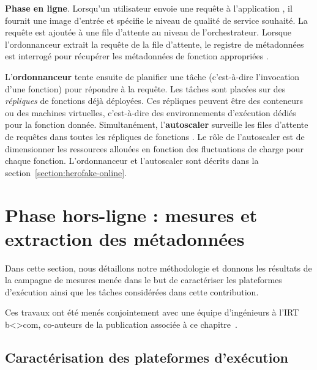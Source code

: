 \textbf{Phase en ligne}. Lorsqu'un utilisateur envoie une requête à l'application , il fournit une image d'entrée et spécifie le niveau de qualité de service souhaité. La requête est ajoutée à une file d'attente  au niveau de l'orchestrateur. Lorsque l'ordonnanceur extrait la requête de la file d'attente, le registre de métadonnées est interrogé pour récupérer les métadonnées de fonction appropriées .

L'\textbf{ordonnanceur} tente ensuite de planifier une tâche (c'est-à-dire l'invocation d'une fonction) pour répondre à la requête. Les tâches sont placées sur des \textit{répliques} de fonctions  déjà déployées. Ces répliques peuvent être des conteneurs ou des machines virtuelles, c'est-à-dire des environnements d'exécution dédiés pour la fonction donnée. Simultanément, l'\textbf{autoscaler} surveille les files d'attente de requêtes dans toutes les répliques de fonctions . Le rôle de l'autoscaler est de dimensionner les ressources allouées en fonction des fluctuations de charge pour chaque fonction. L'ordonnanceur et l'autoscaler sont décrits dans la section~\ref{section:herofake-online}.

\section{Phase hors-ligne : mesures et extraction des métadonnées}
\label{section:herofake-offline}

Dans cette section, nous détaillons notre méthodologie et donnons les résultats de la campagne de mesures menée dans le but de caractériser les plateformes d'exécution ainsi que les tâches considérées dans cette contribution.

Ces travaux ont été menés conjointement avec une équipe d'ingénieurs à l'IRT b{\textless\textgreater}com, co-auteurs de la publication associée à ce chapitre~\cite{herofake}.

\subsection{Caractérisation des plateformes d'exécution}

